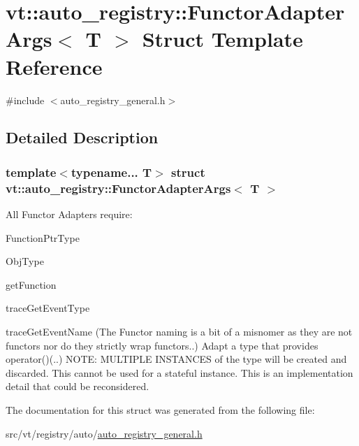 \hypertarget{structvt_1_1auto__registry_1_1_functor_adapter_args}{}\section{vt\+:\+:auto\+\_\+registry\+:\+:Functor\+Adapter\+Args$<$ T $>$ Struct Template Reference}
\label{structvt_1_1auto__registry_1_1_functor_adapter_args}


{\ttfamily \#include $<$auto\+\_\+registry\+\_\+general.\+h$>$}



\subsection{Detailed Description}
\subsubsection*{template$<$typename... T$>$\newline
struct vt\+::auto\+\_\+registry\+::\+Functor\+Adapter\+Args$<$ T $>$}

All Functor Adapters require\+:
\begin{DoxyItemize}
\item Function\+Ptr\+Type
\item Obj\+Type
\item get\+Function
\item trace\+Get\+Event\+Type
\item trace\+Get\+Event\+Name (The \textquotesingle{}Functor\textquotesingle{} naming is a bit of a misnomer as they are not functors nor do they strictly wrap functors..) Adapt a type that provides operator()(..) N\+O\+TE\+: M\+U\+L\+T\+I\+P\+LE I\+N\+S\+T\+A\+N\+C\+ES of the type will be created and discarded. This cannot be used for a stateful instance. This is an implementation detail that could be reconsidered. 
\end{DoxyItemize}

The documentation for this struct was generated from the following file\+:\begin{DoxyCompactItemize}
\item 
src/vt/registry/auto/\hyperlink{auto__registry__general_8h}{auto\+\_\+registry\+\_\+general.\+h}\end{DoxyCompactItemize}
